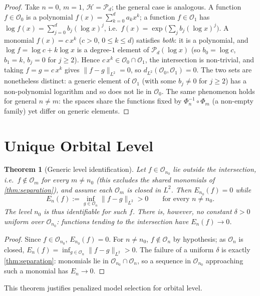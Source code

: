 \documentclass[11pt,twoside,openright]{book}
\theoremstyle{plain}
\newtheorem{theorem}{Theorem}[chapter]
\theoremstyle{definition}
\theoremstyle{remark}
\newcommand{\calH}{\mathcal{H}}
\newcommand{\calO}{\mathcal{O}}
\newcommand{\calP}{\mathcal{P}}
\newcommand{\norm}[1]{\|#1\|}
\begin{document}
\begin{proof}
Take $n = 0$, $m = 1$, $\calH = \calP_d$; the general case is analogous. A function $f\in\calO_0$ is a polynomial $f(x)=\sum_{k=0}^d a_kx^k$; a function $f\in\calO_1$ has $\log f(x)=\sum_{j=0}^d b_j(\log x)^j$, i.e.\ $f(x)=\exp\!\big(\sum_j b_j(\log x)^j\big)$. A monomial $f(x)=c\,x^k$ ($c>0$, $0\le k\le d$) satisfies \emph{both}: it is a polynomial, and $\log f=\log c+k\log x$ is a degree-$1$ element of $\calP_d(\log x)$ (so $b_0=\log c$, $b_1=k$, $b_j=0$ for $j\ge2$). Hence $c\,x^k\in\calO_0\cap\calO_1$, the intersection is non-trivial, and taking $f=g=c\,x^k$ gives $\norm{f-g}_{L^2}=0$, so $d_{L^2}(\calO_0,\calO_1)=0$. The two sets are nonetheless distinct: a generic element of $\calO_1$ (with some $b_j\neq0$ for $j\ge2$) has a non-polynomial logarithm and so does not lie in $\calO_0$. The same phenomenon holds for general $n\neq m$: the spaces share the functions fixed by $\Phi_n^{-1}\circ\Phi_m$ (a non-empty family) yet differ on generic elements.
\end{proof}

\section{Unique Orbital Level}

\begin{theorem}[Generic level identification]
\label{thm:unique-level}
Let $f \in \calO_{n_0}$ lie \emph{outside} the intersection, i.e.\ $f\notin\calO_m$ for every $m\neq n_0$ (this excludes the shared monomials of \cref{thm:separation}), and assume each $\calO_m$ is closed in $L^2$. Then $E_{n_0}(f)=0$ while
\[
E_n(f) := \inf_{g \in \calO_n} \norm{f - g}_{L^2} > 0 \qquad\text{for every } n \neq n_0 .
\]
The level $n_0$ is thus identifiable for such $f$. There is, however, \emph{no} constant $\delta>0$ uniform over $\calO_{n_0}$: functions tending to the intersection have $E_n(f)\to0$.
\end{theorem}

\begin{proof}
Since $f\in\calO_{n_0}$, $E_{n_0}(f)=0$. For $n\neq n_0$, $f\notin\calO_n$ by hypothesis; as $\calO_n$ is closed, $E_n(f)=\inf_{g\in\calO_n}\norm{f-g}_{L^2}>0$. The failure of a uniform $\delta$ is exactly \cref{thm:separation}: monomials lie in $\calO_{n_0}\cap\calO_n$, so a sequence in $\calO_{n_0}$ approaching such a monomial has $E_n\to0$.
\end{proof}

This theorem justifies penalized model selection for orbital level.
\end{document}
